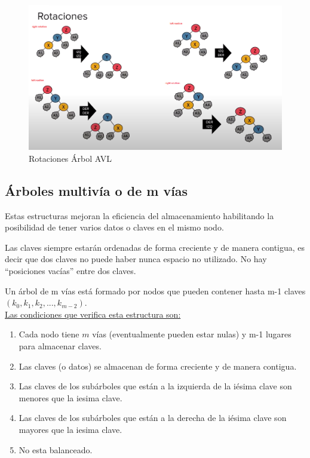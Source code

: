 \documentclass[../main.tex]{subfiles}
\begin{document}
        \begin{figure}[ht]
            \centering
            \includegraphics[width=1\textwidth]{images/Rotaciones.png}
            \caption{Rotaciones Árbol AVL}
            \label{fig:AVL} 
        \end{figure}
        
    \newpage

    \subsection{Árboles multivía o de m vías}
        Estas estructuras mejoran la eficiencia del almacenamiento habilitando la posibilidad de tener varios datos o claves en el mismo nodo.
        
        Las claves siempre estarán ordenadas de forma creciente y de manera contigua, es decir que dos claves no puede haber nunca espacio no utilizado. No hay “posiciones vacías” entre dos claves.

        Un árbol de m vías está formado por nodos que pueden contener hasta m-1 claves $(k_0, k_1,k_2, ... , k_{m-2})$.\\

        \underline{Las condiciones que verifica esta estructura son:}
        \begin{enumerate}
            \item Cada nodo tiene $m$ vías (eventualmente pueden estar nulas) y m-1 lugares para almacenar claves.
            \item Las claves (o datos) se almacenan de forma creciente y de manera contigua.
            \item Las claves de los subárboles que están a la izquierda de la iésima clave son menores que la iesima clave.
            \item Las claves de los subárboles que están a la derecha de la iésima clave son mayores que la iesima clave.
            \item No esta balanceado.
        \end{enumerate}
\end{document}
